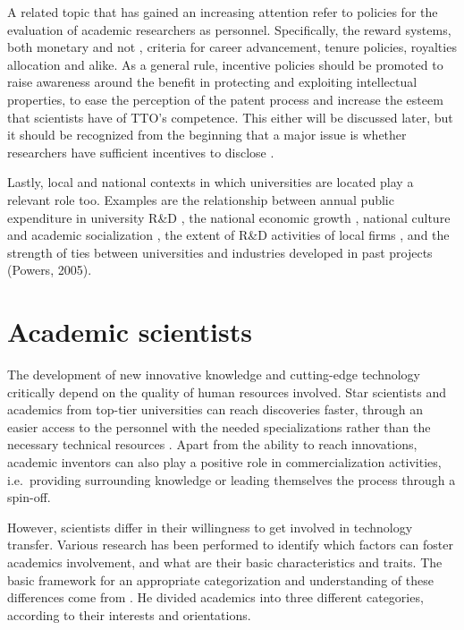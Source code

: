 A related topic that has gained an increasing attention refer to policies for the evaluation of academic researchers as personnel. Specifically, the reward systems, both monetary and not \citep{Guerrero2014}, criteria for career advancement, tenure policies, royalties allocation and alike. As a general rule, incentive policies should be promoted to raise awareness around the benefit in protecting and exploiting intellectual properties, to ease the perception of the patent process and increase the esteem that scientists have of TTO's competence. This either will be discussed later, but it should be recognized from the beginning that a major issue is whether researchers have sufficient incentives to disclose \citep{Debackere2005}.

Lastly, local and national contexts in which universities are located play a relevant role too. Examples are the relationship between annual public expenditure in university R\&D \citep{OShea2005}, the national economic growth \citep{Siegel2003a}, national culture and academic socialization \citep{Bercovitz2006}, the extent of R\&D activities of local firms \citep{Siegel2003a}, and the strength of ties between universities and industries developed in past projects (Powers, 2005). 

\section{Academic scientists}

The development of new innovative knowledge and cutting-edge technology critically depend on the quality of human resources involved. Star scientists and academics from top-tier universities can reach discoveries faster, through an easier access to the personnel with the needed specializations rather than the necessary technical resources \citep{OShea2005}. Apart from the ability to reach innovations, academic inventors can also play a positive role in commercialization activities, i.e.\ providing surrounding knowledge or leading themselves the process through a spin-off.

However, scientists differ in their willingness to get involved in technology transfer. Various research has been performed to identify which factors can foster academics involvement, and what are their basic characteristics and traits. The basic framework for an appropriate categorization and understanding of these differences come from \citet{Stokes1997}. He divided academics into three different categories, according to their interests and orientations. 

